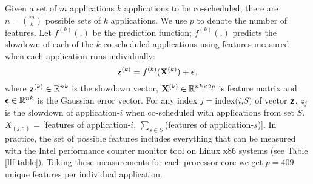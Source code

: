 Given a set of $m$ applications $k$ applications to be co-scheduled,
there are $n = {m \choose k}$ possible sets of $k$ applications. We
use $p$ to denote the number of features.  Let $f^{(k)}(.)$ be the
prediction function; \ie $f^{(k)}(.)$ predicts the slowdown of each of
the $k$ co-scheduled applications using features measured when each
application runs individually:
\begin{equation}
\label{eq:system_general_equation}
\mathbf{z}^{(k)} = f^{(k)}(\mathbf{X}^{(k)}) + \boldsymbol{\epsilon},
\end{equation}
where $ \mathbf{z}^{(k)} \in \mathbb{R}^{nk}$ is the slowdown vector,
$\mathbf{X}^{(k)} \in \mathbb{R}^{nk \times 2p}$ is feature matrix and
$\boldsymbol{\epsilon} \in \mathbb{R}^{nk}$ is the Gaussian error vector. For
any index $j = \text{index($i$,$S$)}$ of vector $\mathbf{z}$, $z_j$ is the
slowdown of application-$i$ when co-scheduled with applications from
set $S$. $X_{(j,:)}$ = [features of application-$i$, $\sum_{s \in
  S}$(features of application-$s$)]. In practice, the set of possible
features includes everything that can be measured with the Intel
performance counter monitor tool \cite{willhalm2012intel} on Linux x86
systems (see Table \ref{llf-table}). Taking these measurements for
each processor core we get $p=409$ unique features per individual
application.

